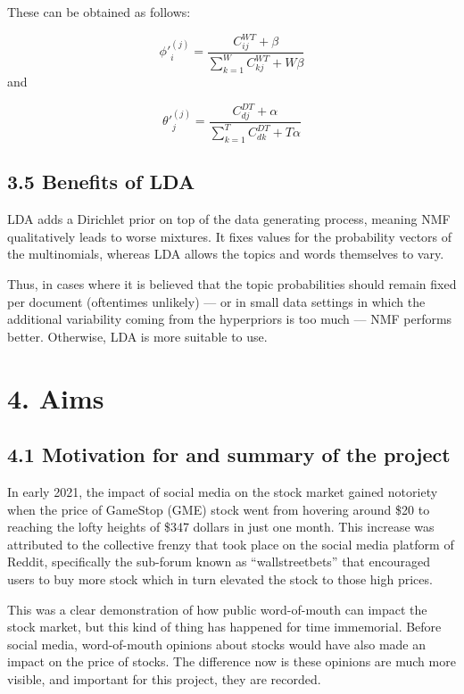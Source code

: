 \documentclass[
]{article}
\begin{document}
These can be obtained as follows:

\begin{equation}
{\phi}'^{(j)}_i= \frac{C^{WT}_{ij} + \beta}{\sum_{k=1}^{W}C^{WT}_{kj} + W\beta}
\end{equation} and

\begin{equation}
{\theta}'^{(j)}_j= \frac{C^{DT}_{dj} + \alpha}{\sum_{k=1}^{T}C^{DT}_{dk} + T\alpha}
\end{equation}

\hypertarget{benefits-of-lda}{%
\subsection{3.5 Benefits of LDA}\label{benefits-of-lda}}

LDA adds a Dirichlet prior on top of the data generating process,
meaning NMF qualitatively leads to worse mixtures. It fixes values for
the probability vectors of the multinomials, whereas LDA allows the
topics and words themselves to vary.

Thus, in cases where it is believed that the topic probabilities should
remain fixed per document (oftentimes unlikely) --- or in small data
settings in which the additional variability coming from the hyperpriors
is too much --- NMF performs better. Otherwise, LDA is more suitable to
use.

\hypertarget{aims}{%
\section{4. Aims}\label{aims}}

\hypertarget{motivation-for-and-summary-of-the-project}{%
\subsection{4.1 Motivation for and summary of the
project}\label{motivation-for-and-summary-of-the-project}}

In early 2021, the impact of social media on the stock market gained
notoriety when the price of GameStop (GME) stock went from hovering
around \$20 to reaching the lofty heights of \$347 dollars in just one
month. This increase was attributed to the collective frenzy that took
place on the social media platform of Reddit, specifically the sub-forum
known as ``wallstreetbets'' that encouraged users to buy more stock
which in turn elevated the stock to those high prices.

This was a clear demonstration of how public word-of-mouth can impact
the stock market, but this kind of thing has happened for time
immemorial. Before social media, word-of-mouth opinions about stocks
would have also made an impact on the price of stocks. The difference
now is these opinions are much more visible, and important for this
project, they are recorded.
\end{document}
